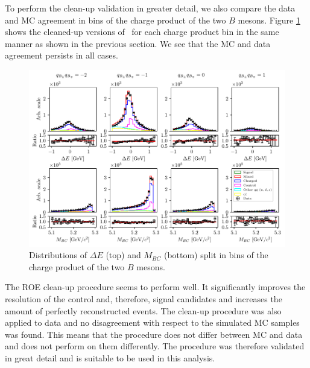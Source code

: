 To perform the clean-up validation in greater detail, we also compare the data and MC agreement in bins of the charge product of the two $B$ mesons. Figure \ref{fig:roe_val_split} shows the cleaned-up versions of \vars~for each charge product bin in the same manner as shown in the previous section. We see that the MC and data agreement persists in all cases. 
\begin{figure}[H]
	\centering
	\captionsetup{width=0.8\linewidth}
	\includegraphics[width=\linewidth]{fig/roe_val_split}
	\caption{Distributions of $\Delta E$ (top) and $M_{BC}$ (bottom) split in bins of the charge product of the two $B$ mesons.}
	\label{fig:roe_val_split}
\end{figure}

The ROE clean-up procedure seems to perform well. It significantly improves the resolution of the control and, therefore, signal candidates and increases the amount of perfectly reconstructed events. The clean-up procedure was also applied to data and no disagreement with respect to the simulated MC samples was found. This means that the procedure does not differ between MC and data and does not perform on them differently. The procedure was therefore validated in great detail and is suitable to be used in this analysis.